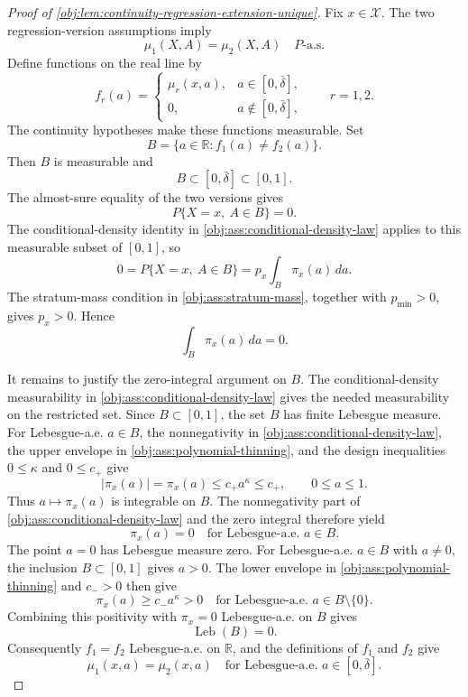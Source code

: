 \documentclass[11pt]{article}
\begin{document}
\begin{proof}[Proof of \cref{obj:lem:continuity-regression-extension-unique}]
Fix \(x\in\mathcal X\).  The two regression-version assumptions imply
\[
\mu_1(X,A)=\mu_2(X,A)
\quad P\text{-a.s.}
\]%
Define functions on the real line by
\[
f_r(a)=
\begin{cases}
\mu_r(x,a),&a\in[0,\bar\delta],\\
0,&a\notin[0,\bar\delta],
\end{cases}
\qquad r=1,2.
\]%
The continuity hypotheses make these functions measurable.  Set
\[
B=\{a\in\mathbb R:f_1(a)\neq f_2(a)\}.
\]%
Then \(B\) is measurable and
\[
B\subset[0,\bar\delta]\subset[0,1].
\]%
The almost-sure equality of the two versions gives
\[
P\{X=x,\ A\in B\}=0.
\]%
The conditional-density identity in \cref{obj:ass:conditional-density-law} applies to this measurable subset of \([0,1]\), so
\[
0=P\{X=x,\ A\in B\}
=
p_x\int_B\pi_x(a)\,da.
\]%
The stratum-mass condition in \cref{obj:ass:stratum-mass}, together with \(p_{\min}>0\), gives \(p_x>0\).  Hence
\[
\int_B\pi_x(a)\,da=0.
\]%

It remains to justify the zero-integral argument on \(B\).  The conditional-density measurability in \cref{obj:ass:conditional-density-law} gives the needed measurability on the restricted set.  Since \(B\subset[0,1]\), the set \(B\) has finite Lebesgue measure.  For Lebesgue-a.e. \(a\in B\), the nonnegativity in \cref{obj:ass:conditional-density-law}, the upper envelope in \cref{obj:ass:polynomial-thinning}, and the design inequalities \(0\leq\kappa\) and \(0\leq c_+\) give
\[
|\pi_x(a)|=\pi_x(a)
\leq c_+a^\kappa
\leq c_+,
\qquad 0\leq a\leq1 .
\]%
Thus \(a\mapsto\pi_x(a)\) is integrable on \(B\).  The nonnegativity part of \cref{obj:ass:conditional-density-law} and the zero integral therefore yield
\[
\pi_x(a)=0
\quad\text{for Lebesgue-a.e. }a\in B.
\]%
The point \(a=0\) has Lebesgue measure zero.  For Lebesgue-a.e. \(a\in B\) with \(a\neq0\), the inclusion \(B\subset[0,1]\) gives \(a>0\).  The lower envelope in \cref{obj:ass:polynomial-thinning} and \(c_->0\) then give
\[
\pi_x(a)\geq c_-a^\kappa>0
\quad\text{for Lebesgue-a.e. }a\in B\setminus\{0\}.
\]%
Combining this positivity with \(\pi_x=0\) Lebesgue-a.e. on \(B\) gives
\[
\operatorname{Leb}(B)=0.
\]%
Consequently \(f_1=f_2\) Lebesgue-a.e. on \(\mathbb R\), and the definitions of \(f_1\) and \(f_2\) give
\[
\mu_1(x,a)=\mu_2(x,a)
\quad\text{for Lebesgue-a.e. }a\in[0,\bar\delta].
\]%


\end{proof}
\end{document}
